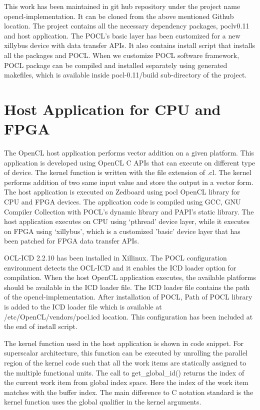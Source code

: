 This work has been maintained in git hub repository under the project name opencl-implementation. It can be cloned from the above mentioned Github location. The project contains all the necessary dependency packages, poclv0.11 and host application. The POCL’s basic layer has been customized for a new xillybus device with data transfer APIs. It also contains install script that installs all the packages and POCL. When we customize POCL software framework, POCL package can be compiled and installed separately using generated makefiles, which is available inside pocl-0.11/build sub-directory of the project.

\section{Host Application for CPU and FPGA}
The OpenCL host application performs vector addition on a given platform. This application is developed using OpenCL C APIs that can execute on different type of device. The kernel function is written with the file extension of .cl. The kernel performs addition of two same input value and store the output in a vector form. The host application is executed on Zedboard using pocl OpenCL library for CPU and FPGA devices. The application code is compiled using GCC, GNU Compiler Collection with POCL’s dynamic library and PAPI’s static library. The host application executes on CPU using ‘pthread’ device layer, while it executes on FPGA using ‘xillybus’, which is a customized 'basic' device layer that has been patched for FPGA data transfer APIs. 
 
OCL-ICD 2.2.10 has been installed in Xillinux. The POCL configuration environment detects the OCL-ICD and it enables the ICD loader option for compilation. When the host OpenCL application executes, the available platforms should be available in the ICD loader file. The ICD loader file contains the path of the opencl-implementation. After installation of POCL, Path of POCL library is added to the ICD loader file which is available at /etc/OpenCL/vendors/pocl.icd location. This configuration has been included at the end of install script.

The kernel function used in the host application is shown in code snippet. For superscalar architecture, this function can be executed by unrolling the parallel region of the kernel code such that all the work items are statically assigned to the multiple functional units. The call to get\_global\_id() returns the index of the current work item from global index space. Here the index of the work item matches with the buffer index. The main difference to C notation standard is the kernel function uses the global qualifier in the kernel arguments. 
	

